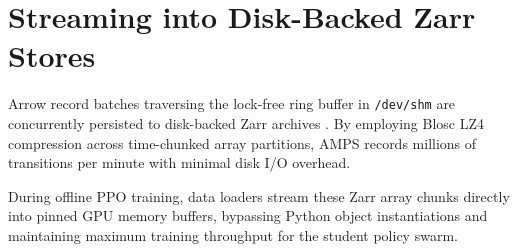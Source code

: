 \section{Streaming into Disk-Backed Zarr Stores}

Arrow record batches traversing the lock-free ring buffer in \texttt{/dev/shm} are concurrently persisted to disk-backed Zarr archives \cite{zarr2023dev}. By employing Blosc LZ4 compression across time-chunked array partitions, AMPS records millions of transitions per minute with minimal disk I/O overhead.

During offline PPO training, data loaders stream these Zarr array chunks directly into pinned GPU memory buffers, bypassing Python object instantiations and maintaining maximum training throughput for the student policy swarm.
